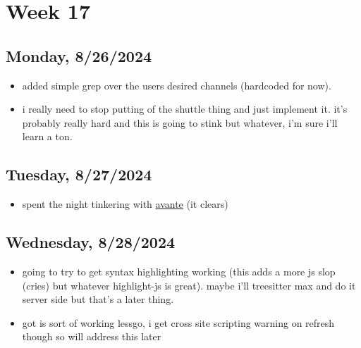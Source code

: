 \newpage
\section{Week 17}

\subsection*{Monday, 8/26/2024}
\begin{itemize}
    \item added simple grep over the users desired channels (hardcoded for now).
    \item i really need to stop putting of the shuttle thing and just implement
        it. it's probably really hard and this is going to stink but whatever,
        i'm sure i'll learn a ton.
\end{itemize}

\subsection*{Tuesday, 8/27/2024}
\begin{itemize}
    \item spent the night tinkering with 
        \textcolor{blue}{\href{https://github.com/yetone/avante.nvim}{avante}} 
        (it clears)
\end{itemize}

\subsection*{Wednesday, 8/28/2024}
\begin{itemize}
    \item going to try to get syntax highlighting working (this adds a more js
        slop (cries) but whatever highlight-js is great). maybe i'll treesitter
        max and do it server side but that's a later thing.
    \item got is sort of working lessgo, i get cross site scripting warning on
        refresh though so will address this later
\end{itemize}

